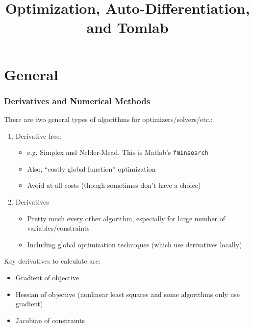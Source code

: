 \documentclass[nofootline]{etk-presentation}
\begin{document}
\title{Optimization, Auto-Differentiation, and Tomlab}
\maketitle
\section{General}
\begin{frame}[fragile]	\frametitle{Derivatives and Numerical Methods}
	There are two general types of algorithms for optimizers/solvers/etc.:
	\begin{enumerate}
		\item Derivative-free:
		\begin{itemize}
			\item e.g. Simplex and Nelder-Mead.  This is Matlab's \verb|fminsearch|
			\item Also, ``costly global function'' optimization
			\item Avoid at all costs (though sometimes don't have a choice)
		\end{itemize}
	\bigskip
		\item Derivatives
		\begin{itemize}
			\item Pretty much every other algorithm, especially for large number of variables/constraints
			\item Including global optimization techniques (which use derivatives locally)
		\end{itemize}	
	\end{enumerate}
\bigskip
Key derivatives to calculate are:
\begin{itemize}
	\item Gradient of objective
	\item Hessian of objective (nonlinear least squares and some algorithms only use gradient)
	\item Jacobian of constraints
\end{itemize}


\end{frame}
\end{document}
